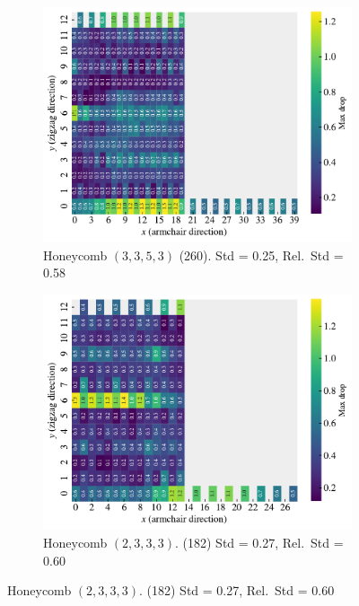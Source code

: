 \begin{figure}[!htb]
\begin{subfigure}[t]{0.49\textwidth}
  \end{subfigure}
  \hfill
  \begin{subfigure}[t]{0.49\textwidth}
      \centering
      \includegraphics[width=\textwidth]{figures/search/ref_search_drop_hon_3_3_5_3_ref_search.pdf}
      \caption{Honeycomb $(3,3,5,3)$ (260). Std = 0.25, Rel.\ Std = 0.58}
      \label{fig:hon_3353_trans}
  \end{subfigure}
  \hfill
  \begin{subfigure}[t]{0.49\textwidth}
      \centering
      \includegraphics[width=\textwidth]{figures/search/ref_search_drop_hon_2_3_3_3_ref_search.pdf}
      \caption{Honeycomb $(2,3,3,3)$. (182)  Std = 0.27, Rel.\ Std = 0.60}

\end{subfigure}
\end{figure}
